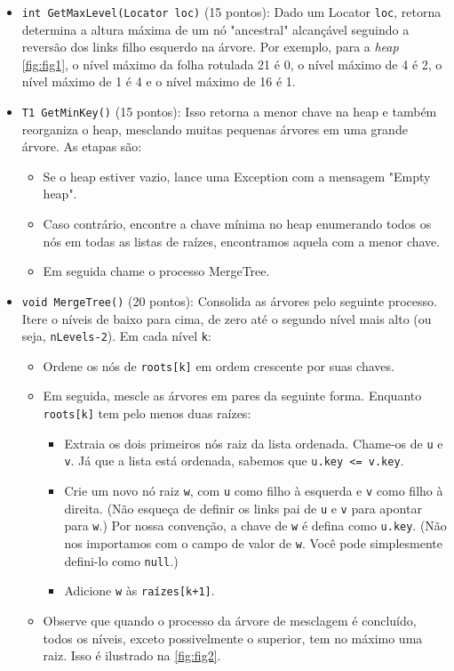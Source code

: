 \documentclass{article}
\begin{document}
\begin{itemize}
    \item  \texttt{int GetMaxLevel(Locator loc)} (15 pontos): Dado um Locator \texttt{loc}, retorna determina a altura máxima de um nó "ancestral" alcançável seguindo a reversão dos links filho esquerdo na árvore. Por exemplo, para a \textit{heap} \autoref{fig:fig1}, o nível máximo da folha rotulada 21 é 0, o nível máximo de 4 é 2, o nível máximo de 1 é 4 e o nível máximo de 16 é 1.
    \item \texttt{T1 GetMinKey()} (15 pontos): Isso retorna a menor chave na heap e também reorganiza o heap, mesclando muitas pequenas árvores em uma grande árvore. As etapas são:
    \begin{itemize}
        \item Se o heap estiver vazio, lance uma Exception com a mensagem "Empty heap".
        \item Caso contrário, encontre a chave mínima no heap enumerando todos os nós em todas as listas de raízes, encontramos aquela com a menor chave. 
        \item Em seguida chame o processo MergeTree.
    \end{itemize}
    \item \texttt{void MergeTree()} (20 pontos): Consolida as árvores pelo seguinte processo. Itere o níveis de baixo para cima, de zero até o segundo nível mais alto (ou seja, \texttt{nLevels-2}). Em cada nível \texttt{k}:
    \begin{itemize}
        \item Ordene os nós de \texttt{roots[k]} em ordem crescente por suas chaves.
        \item Em seguida, mescle as árvores em pares da seguinte forma. Enquanto \texttt{roots[k]} tem pelo menos duas raízes:
        \begin{itemize}
            \item Extraia os dois primeiros nós raiz da lista ordenada. Chame-os de \texttt{u} e \texttt{v}. Já que a lista está ordenada, sabemos que \texttt{u.key <= v.key}.
            \item Crie um novo nó raiz \texttt{w}, com \texttt{u} como filho à esquerda e \texttt{v} como filho à direita. (Não esqueça de definir os links pai de \texttt{u} e \texttt{v} para apontar para \texttt{w}.) Por nossa convenção, a chave de \texttt{w} é defina como \texttt{u.key}. (Não nos importamos com o campo de valor de \texttt{w}. Você pode simplesmente defini-lo como \texttt{null}.)
            \item Adicione \texttt{w} às \texttt{raízes[k+1]}.
        \end{itemize}
    \item Observe que quando o processo da árvore de mesclagem é concluído, todos os níveis, exceto possivelmente o superior,
tem no máximo uma raiz. Isso é ilustrado na \autoref{fig:fig2}.
    \end{itemize}
\end{itemize}
\end{document}
